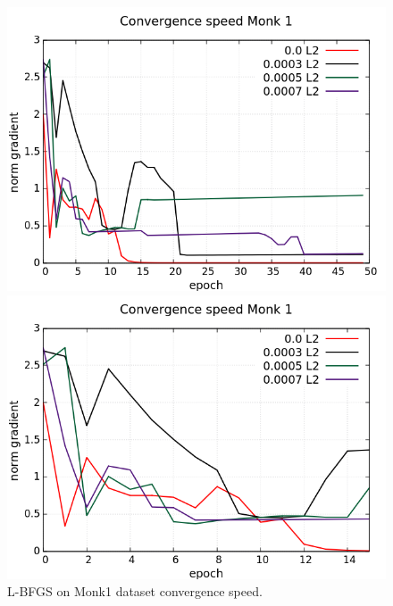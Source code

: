 \begin{figure}[H]
	\centering
	\begin{minipage}[t]{0.5\linewidth}
		\includegraphics[width=\linewidth]{data/LBFGS/Monk1/Monk1_LBFGS_CS_standard.png}
	\end{minipage}%
	\begin{minipage}[t]{0.5\linewidth}
		\includegraphics[width=\linewidth]{data/LBFGS/Monk1/Monk1_LBFGS_CS_zoom.png}
	\end{minipage}
	\caption{L-BFGS on Monk1 dataset convergence speed.}
\end{figure}
